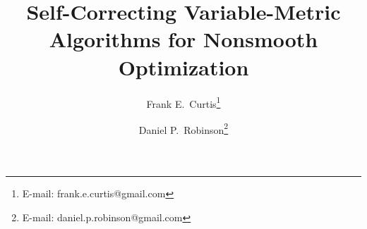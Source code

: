 \documentclass[10pt]{article}
\begin{document}
\title{Self-Correcting Variable-Metric Algorithms for Nonsmooth Optimization}

\author{Frank E.~Curtis\thanks{E-mail: frank.e.curtis@gmail.com}}
\author{Daniel P.~Robinson\thanks{E-mail: daniel.p.robinson@gmail.com}}
\titlepage

\maketitle

\begin{abstract}
  
\end{abstract}





\end{document}
